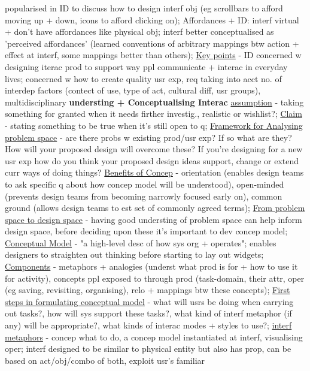 \documentclass[a4paper]{article}
\begin{document}
\begin{multicols}{3}
        popularised in ID to discuss how to design interf obj (eg scrollbars to afford moving up + down, icons to afford clicking on); Affordances + ID: interf virtual + don't have
        affordances like physical obj; interf better conceptualised as 'perceived affordances' (learned conventions of arbitrary mappings btw action + effect at interf, some mappings
        better than others); \underline{Key points} - ID concerned w designing iterac prod to support way ppl communicate + interac in everyday lives; concerned w how to create
        quality usr exp, req taking into acct no. of interdep factors (contect of use, type of act, cultural diff, usr groups), multidisciplinary \newline \textbf{understing + Conceptualising Interac}
        \underline{assumption} - taking something for granted when it needs firther investig., realistic or wishlist?; \underline{Claim} - stating something to be true when it's still open to q;
        \underline{Framework for Analysing problem space} - are there probs w existing prod/usr exp? If so what are they? How will your proposed design will overcome these? If you're designing for a
        new usr exp how do you think your proposed design ideas support, change or extend curr ways of doing things? \underline{Benefits of Concep} - orientation (enables design teams to ask specific
        q about how concep model will be understood), open-minded (prevents design teams from becoming narrowly focused early on), common ground (allows design teams to est set of commonly agreed terms);
        \underline{From problem space to design space} - having good understing of problem space can help inform design space, before deciding upon these it's important to dev concep model; \underline{Conceptual Model} -
        "a high-level desc of how sys org + operates"; enables designers to straighten out thinking before starting to lay out widgets; \underline{Components} - metaphors + analogies (underst what prod is for
        + how to use it for activity), concepts ppl exposed to through prod (task-domain, their attr, oper (eg saving, revisiting, organising), relo + mappings btw these concepts);
        \underline{First steps in formulating conceptual model} - what will usrs be doing when carrying out tasks?, how will sys support these tasks?, what kind of interf metaphor (if any) will be appropriate?,
        what kinds of interac modes + styles to use?; \underline{interf metaphors} - concep what to do, a concep
        model instantiated at interf, visualising oper; interf designed to be similar to physical entity but also has prop, can be based on act/obj/combo of both, exploit usr's familiar

\end{multicols}
\end{document}
